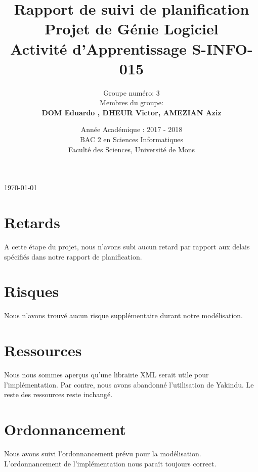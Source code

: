 \documentclass[]{article}
\begin{document}
\title{
{\Huge Rapport de suivi de planification}\\
Projet de Génie Logiciel\\
\smallskip
{\small Activité d'Apprentissage \textsf{S-INFO-015}}\\
}

\author{Groupe numéro: 3\\
Membres du groupe:\\
\textbf{DOM Eduardo , DHEUR Victor, AMEZIAN Aziz}\\
}


\date{Année Académique : 2017 - 2018\\
BAC 2 en Sciences Informatiques\\
\vspace{1cm}
Faculté des Sciences, Université de Mons}

\maketitle              %

\bigskip
\begin{center} \today \end{center}

\newpage
\section{Retards}\label{sec:retards}
A cette étape du projet, nous n'avons subi aucun retard par rapport aux delais spécifiés dans notre rapport de planification.
\section{Risques}\label{sec:risques}
Nous n'avons trouvé aucun risque supplémentaire durant notre modélisation.
\section{Ressources}\label{sec:res}
Nous nous sommes aperçus qu'une librairie XML serait utile pour l'implémentation. Par contre, nous avons abandonné l'utilisation de Yakindu. Le reste des ressources reste inchangé.
\section{Ordonnancement}\label{sec:ord}
Nous avons suivi l'ordonnancement prévu pour la modélisation. L'ordonnancement de l'implémentation nous paraît toujours correct.
\end{document}
